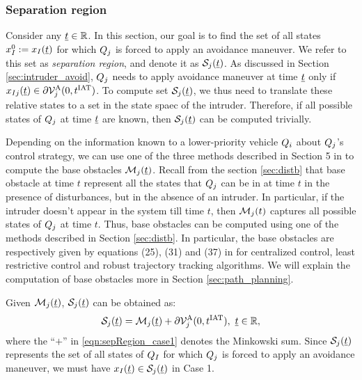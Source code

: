 \subsubsection{Separation region} \label{sec:sepRegion_case1}
Consider any $\underline{t} \in \mathbb{R}$. In this section, our goal is to find the set of all states $x_{I}^0 := x_{I}(\underline{t})$ for which $Q_j$ is forced to apply an avoidance maneuver. We refer to this set as \textit{separation region}, and denote it as $\mathcal{S}_j(\underline{t})$. As discussed in Section \ref{sec:intruder_avoid}, $Q_j$ needs to apply avoidance maneuver at time $\underline{t}$ only if $x_{I j}(\underline{t}) \in \partial \mathcal{V}^{\text{A}}_{j}(0, t^\text{IAT})$. To compute set $\mathcal{S}_j(\underline{t})$, we thus need to translate these relative states to a set in the state spaec of the intruder. Therefore, if all possible states of $Q_j$ at time $\underline{t}$ are known, then $\mathcal{S}_j(\underline{t})$ can be computed trivially.

Depending on the information known to a lower-priority vehicle $Q_i$ about $Q_j$'s control strategy, we can use one of the three methods described in Section 5 in \cite{chen2016robust} to compute the base obstacles $\mathcal{M}_j(\underline{t})$. Recall from the section \ref{sec:distb} that base obstacle at time $t$ represent all the states that $Q_j$ can be in at time $t$ in the presence of disturbances, but in the absence of an intruder. In particular, if the intruder doesn't appear in the system till time $t$, then  $\mathcal{M}_j(t)$ captures all possible states of $Q_j$ at time $t$. Thus, base obstacles can be computed using one of the methods described in Section \ref{sec:distb}. In particular, the base obstacles are respectively given by equations (25), (31) and (37) in \cite{chen2016robust} for centralized control, least restrictive control and robust trajectory tracking algorithms. We will explain the computation of base obstacles more in Section \ref{sec:path_planning}.

Given $\mathcal{M}_j(\underline{t})$, $\mathcal{S}_j(\underline{t})$ can be obtained as:
\begin{equation} \label{eqn:sepRegion_case1}
\sep_j(\tsa) = \boset_j(\tsa) + \partial \brs^{\text{A}}_{j}(0, \iat), ~\tsa \in \R,
\end{equation}
where the ``$+$'' in \eqref{eqn:sepRegion_case1} denotes the Minkowski sum. Since $\mathcal{S}_j(\underline{t})$ represents the set of all states of $Q_I$ for which $Q_j$ is forced to apply an avoidance maneuver, we must have $x_{I}(\underline{t}) \in \mathcal{S}_j(\underline{t})$ in Case 1.
